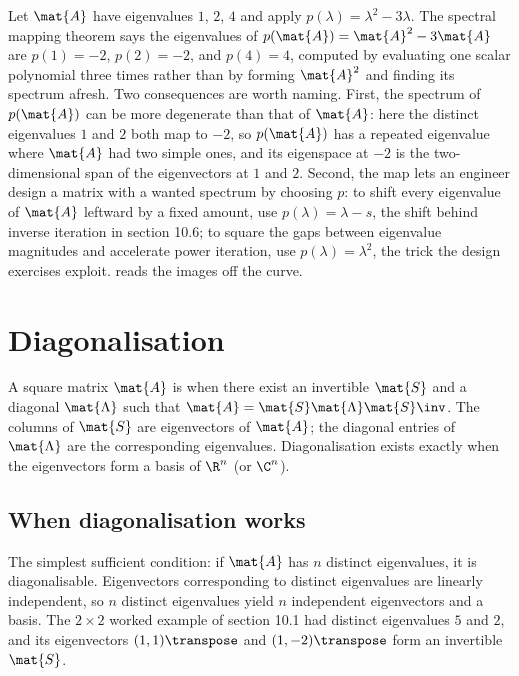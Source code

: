 \begin{example}
Let $\mat{A}$ have eigenvalues $1$, $2$, $4$ and apply $p(\lambda) =
\lambda^{2} - 3\lambda$. The spectral mapping theorem says the
eigenvalues of $p(\mat{A}) = \mat{A}^{2} - 3\mat{A}$ are $p(1) = -2$,
$p(2) = -2$, and $p(4) = 4$, computed by evaluating one scalar
polynomial three times rather than by forming $\mat{A}^{2}$ and finding
its spectrum afresh. Two consequences are worth naming. First, the
spectrum of $p(\mat{A})$ can be more degenerate than that of $\mat{A}$:
here the distinct eigenvalues $1$ and $2$ both map to $-2$, so
$p(\mat{A})$ has a repeated eigenvalue where $\mat{A}$ had two simple
ones, and its eigenspace at $-2$ is the two-dimensional span of the
eigenvectors at $1$ and $2$. Second, the map lets an engineer design a
matrix with a wanted spectrum by choosing $p$: to shift every
eigenvalue of $\mat{A}$ leftward by a fixed amount, use $p(\lambda) =
\lambda - s$, the shift behind inverse iteration in section 10.6; to
square the gaps between eigenvalue magnitudes and accelerate power
iteration, use $p(\lambda) = \lambda^{2}$, the trick the design
exercises exploit.  reads the
images off the curve.
\end{example}



\section{Diagonalisation}

A square matrix $\mat{A}$ is  when there
exist an invertible $\mat{S}$ and a diagonal $\mat{\Lambda}$ such
that $\mat{A} = \mat{S} \mat{\Lambda} \mat{S}\inv$. The columns of
$\mat{S}$ are eigenvectors of $\mat{A}$; the diagonal entries of
$\mat{\Lambda}$ are the corresponding eigenvalues. Diagonalisation
exists exactly when the eigenvectors form a basis of $\R^{n}$ (or
$\C^{n}$).

\subsection{When diagonalisation works}

The simplest sufficient condition: if $\mat{A}$ has $n$ distinct
eigenvalues, it is diagonalisable. Eigenvectors corresponding to
distinct eigenvalues are linearly independent, so $n$ distinct
eigenvalues yield $n$ independent eigenvectors and a basis. The
$2 \times 2$ worked example of section 10.1 had distinct eigenvalues
$5$ and $2$, and its eigenvectors $(1, 1)\transpose$ and $(1, -2)
\transpose$ form an invertible $\mat{S}$.

